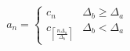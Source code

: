 \documentclass{article}
\begin{document}
\begin{titlepage}


\begin{equation*}
a_{n}= \left \{ 
\begin{array}{cc}
c_{n} & \Delta _{b}\geqslant \Delta _{a} \\ 
c_{\left\lceil \frac{n\Delta _{a}}{\Delta _{b}}\right\rceil } & \Delta_{b}<\Delta _{a}
\end{array}
\right.
\end{equation*}


\end{titlepage}
\end{document}
